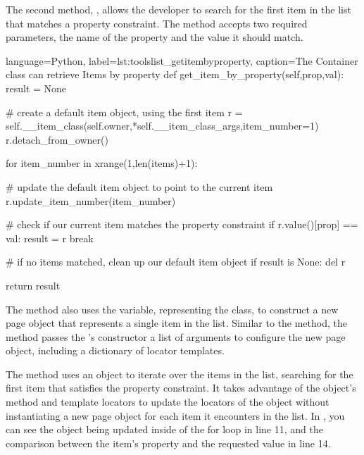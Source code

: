 The second method, , allows the developer to search
for the first item in the list that matches a property constraint.  The method
accepts two required parameters, the name of the property and the value it
should match.

\begin{xcode}{%
  language=Python,%
  label=lst:toolslist_getitembyproperty,%
  caption={The Container class can retrieve Items by property}%
}
    def get_item_by_property(self,prop,val):
        result = None

        # create a default item object, using the first item
        r = self.__item_class(self.owner,*self.__item_class_args,item_number=1)
        r.detach_from_owner()

        for item_number in xrange(1,len(items)+1):

            # update the default item object to point to the current item
            r.update_item_number(item_number)

            # check if our current item matches the property constraint
            if r.value()[prop] == val:
              result = r
              break

        # if no items matched, clean up our default item object
        if result is None:
          del r

        return result
\end{xcode}

The  method also uses the
 variable, representing the  class,
to construct a new page object that represents a single item in the list.
Similar to the  method, the
 method passes the
's constructor a list of arguments to configure
the new page object, including a dictionary of locator templates.

The  method uses an  object
to iterate over the items in the list, searching for the first item that
satisfies the property constraint. It takes advantage of the 
object's  method and template locators to
update the locators of the object without instantiating a new page object for
each item it encounters in the list. In
, you can see the  object
being updated inside of the for loop in line 11, and the comparison between the
item's property and the requested value in line 14.



